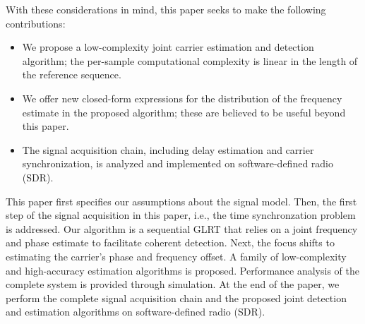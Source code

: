 With these considerations in mind, this paper seeks to make the following contributions:
\begin{itemize}
\item We propose a low-complexity joint carrier estimation and detection algorithm; the per-sample computational complexity is linear
in the length of the reference sequence.
\item We offer new closed-form expressions for the distribution of the frequency estimate in the proposed algorithm; these are believed
to be useful beyond this paper.
\item The signal acquisition chain, including delay estimation and carrier synchronization, is analyzed and implemented on software-defined radio (SDR).
\end{itemize}

This paper first specifies our assumptions about the signal
model. Then, the first step of the signal acquisition in this paper, i.e., the time synchronzation
problem is addressed. Our algorithm is a sequential GLRT that relies on a joint frequency and phase
estimate to facilitate coherent detection. Next, the focus shifts to estimating the carrier's phase 
and frequency offset. A family of low-complexity and high-accuracy estimation algorithms is proposed.
Performance analysis of the complete system is provided through simulation. At the end of the paper,
we perform the complete signal acquisition chain and the proposed joint detection and estimation algorithms
on software-defined radio (SDR).




